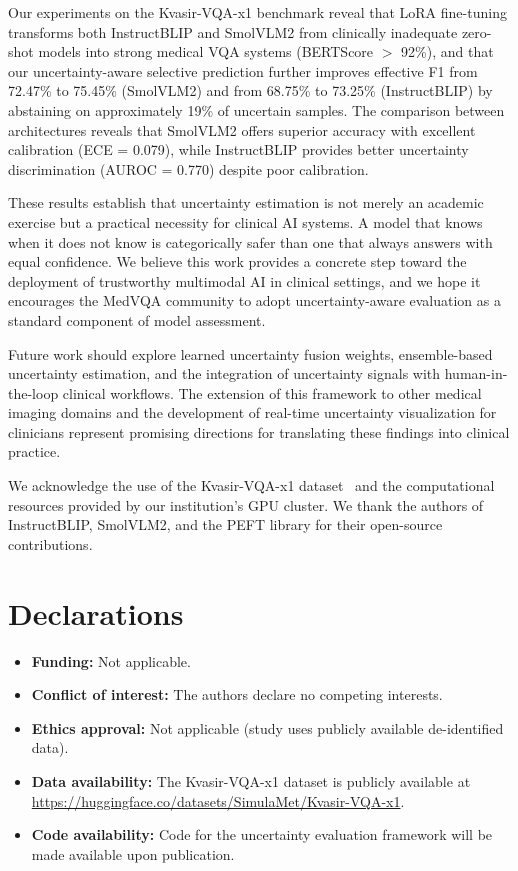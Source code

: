 \documentclass[pdflatex,sn-mathphys-num]{sn-jnl}
\begin{document}
Our experiments on the Kvasir-VQA-x1 benchmark reveal that LoRA fine-tuning transforms both InstructBLIP and SmolVLM2 from clinically inadequate zero-shot models into strong medical VQA systems (BERTScore $>$ 92\%), and that our uncertainty-aware selective prediction further improves effective F1 from 72.47\% to 75.45\% (SmolVLM2) and from 68.75\% to 73.25\% (InstructBLIP) by abstaining on approximately 19\% of uncertain samples. The comparison between architectures reveals that SmolVLM2 offers superior accuracy with excellent calibration (ECE = 0.079), while InstructBLIP provides better uncertainty discrimination (AUROC = 0.770) despite poor calibration.

These results establish that uncertainty estimation is not merely an academic exercise but a practical necessity for clinical AI systems. A model that knows when it does not know is categorically safer than one that always answers with equal confidence. We believe this work provides a concrete step toward the deployment of trustworthy multimodal AI in clinical settings, and we hope it encourages the MedVQA community to adopt uncertainty-aware evaluation as a standard component of model assessment.

Future work should explore learned uncertainty fusion weights, ensemble-based uncertainty estimation, and the integration of uncertainty signals with human-in-the-loop clinical workflows. The extension of this framework to other medical imaging domains and the development of real-time uncertainty visualization for clinicians represent promising directions for translating these findings into clinical practice.

\backmatter


We acknowledge the use of the Kvasir-VQA-x1 dataset~\cite{gautam2025kvasirx1} and the computational resources provided by our institution's GPU cluster. We thank the authors of InstructBLIP, SmolVLM2, and the PEFT library for their open-source contributions.

\section*{Declarations}

\begin{itemize}
\item \textbf{Funding:} Not applicable.
\item \textbf{Conflict of interest:} The authors declare no competing interests.
\item \textbf{Ethics approval:} Not applicable (study uses publicly available de-identified data).
\item \textbf{Data availability:} The Kvasir-VQA-x1 dataset is publicly available at \url{https://huggingface.co/datasets/SimulaMet/Kvasir-VQA-x1}.
\item \textbf{Code availability:} Code for the uncertainty evaluation framework will be made available upon publication.
\end{itemize}
\end{document}
